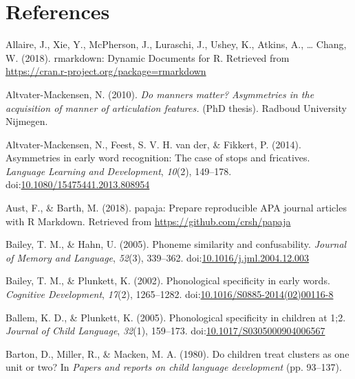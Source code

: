 \documentclass[man]{apa6}
\begin{document}
\newpage

\hypertarget{references}{%
\section{References}\label{references}}

\begingroup
\setlength{\parindent}{-0.5in}
\setlength{\leftskip}{0.5in}

\hypertarget{refs}{}
\leavevmode\hypertarget{ref-RMarkdown}{}%
Allaire, J., Xie, Y., McPherson, J., Luraschi, J., Ushey, K., Atkins, A., \ldots{} Chang, W. (2018). rmarkdown: Dynamic Documents for R. Retrieved from \url{https://cran.r-project.org/package=rmarkdown}

\leavevmode\hypertarget{ref-Altvater2010}{}%
Altvater-Mackensen, N. (2010). \emph{Do manners matter? Asymmetries in the acquisition of manner of articulation features.} (PhD thesis). Radboud University Nijmegen.

\leavevmode\hypertarget{ref-Altvater2014}{}%
Altvater-Mackensen, N., Feest, S. V. H. van der, \& Fikkert, P. (2014). Asymmetries in early word recognition: The case of stops and fricatives. \emph{Language Learning and Development}, \emph{10}(2), 149--178. doi:\href{https://doi.org/10.1080/15475441.2013.808954}{10.1080/15475441.2013.808954}

\leavevmode\hypertarget{ref-papaja}{}%
Aust, F., \& Barth, M. (2018). papaja: Prepare reproducible APA journal articles with R Markdown. Retrieved from \url{https://github.com/crsh/papaja}

\leavevmode\hypertarget{ref-Bailey2005}{}%
Bailey, T. M., \& Hahn, U. (2005). Phoneme similarity and confusability. \emph{Journal of Memory and Language}, \emph{52}(3), 339--362. doi:\href{https://doi.org/10.1016/j.jml.2004.12.003}{10.1016/j.jml.2004.12.003}

\leavevmode\hypertarget{ref-Bailey2002}{}%
Bailey, T. M., \& Plunkett, K. (2002). Phonological specificity in early words. \emph{Cognitive Development}, \emph{17}(2), 1265--1282. doi:\href{https://doi.org/10.1016/S0885-2014(02)00116-8}{10.1016/S0885-2014(02)00116-8}

\leavevmode\hypertarget{ref-Ballem2005}{}%
Ballem, K. D., \& Plunkett, K. (2005). Phonological specificity in children at 1;2. \emph{Journal of Child Language}, \emph{32}(1), 159--173. doi:\href{https://doi.org/10.1017/S0305000904006567}{10.1017/S0305000904006567}

\leavevmode\hypertarget{ref-Barton1980}{}%
Barton, D., Miller, R., \& Macken, M. A. (1980). Do children treat clusters as one unit or two? In \emph{Papers and reports on child language development} (pp. 93--137).
\end{document}
